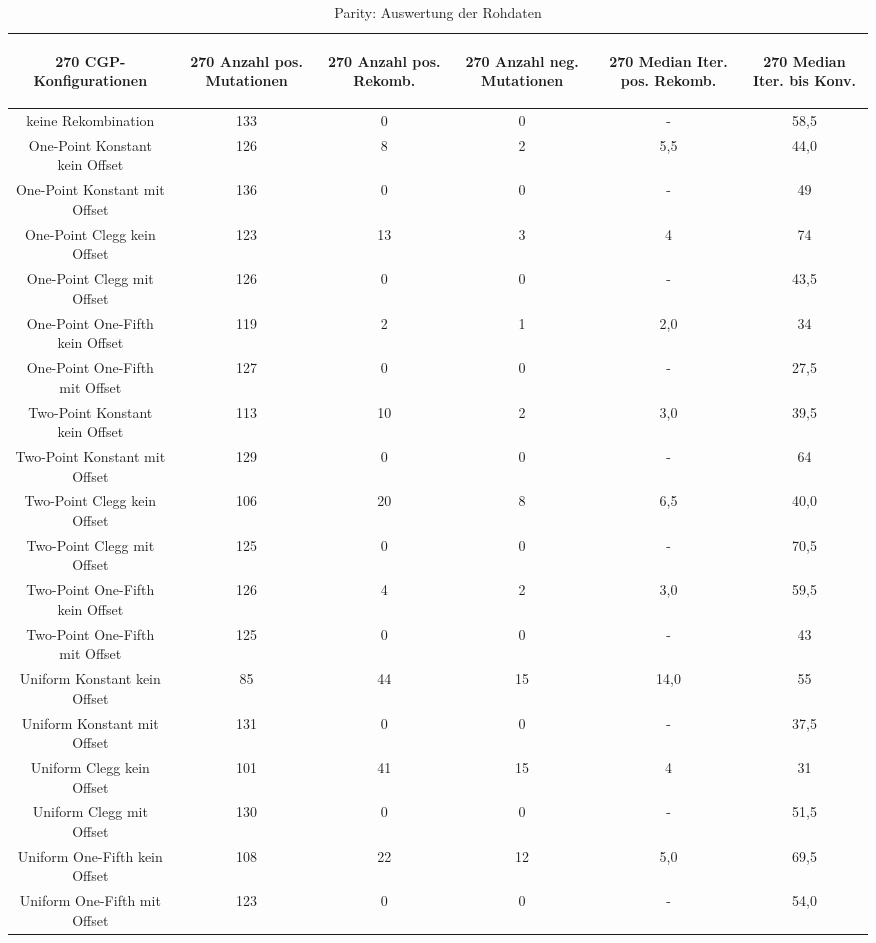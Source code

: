 \begin{table}[H]
	\centering
	\begin{tabular}{c | c | c | c | c | c }
		\begin{turn}{270} \textbf{CGP-Konfigurationen} \end{turn} & \begin{turn}{270} \textbf{Anzahl pos. Mutationen} \end{turn} & \begin{turn}{270} \textbf{Anzahl pos. Rekomb.} \end{turn} & \begin{turn}{270} \textbf{Anzahl neg. Mutationen} \end{turn} & \begin{turn}{270} \textbf{Median Iter. pos. Rekomb.} \end{turn} & \begin{turn}{270} \textbf{Median Iter. bis Konv.} \end{turn}\\
		\hline
		keine Rekombination & 133 & 0 & 0 & - & 58,5\\
		\hline
		One-Point Konstant kein Offset & 126 & 8 & 2 & 5,5 & 44,0\\
		\hline
		One-Point Konstant mit Offset & 136 & 0 & 0 & - & 49\\
		\hline
		One-Point Clegg kein Offset & 123 & 13 & 3 & 4 & 74\\
		\hline
		One-Point Clegg mit Offset & 126 & 0 & 0 & - & 43,5\\
		\hline
		One-Point One-Fifth kein Offset & 119 & 2 & 1 & 2,0 & 34\\
		\hline
		One-Point One-Fifth mit Offset & 127 & 0 & 0 & - & 27,5\\
		\hline
		Two-Point Konstant kein Offset & 113 & 10 & 2 & 3,0 & 39,5\\
		\hline
		Two-Point Konstant mit Offset & 129 & 0 & 0 & - & 64\\
		\hline
		Two-Point Clegg kein Offset & 106 & 20 & 8 & 6,5 & 40,0\\
		\hline
		Two-Point Clegg mit Offset & 125 & 0 & 0 & - & 70,5\\
		\hline
		Two-Point One-Fifth kein Offset & 126 & 4 & 2 & 3,0 & 59,5\\
		\hline
		Two-Point One-Fifth mit Offset & 125 & 0 & 0 & - & 43\\
		\hline
		Uniform Konstant kein Offset & 85 & 44 & 15 & 14,0 & 55\\
		\hline
		Uniform Konstant mit Offset & 131 & 0 & 0 & - & 37,5\\
		\hline
		Uniform Clegg kein Offset & 101 & 41 & 15 & 4 & 31\\
		\hline
		Uniform Clegg mit Offset & 130 & 0 & 0 & - & 51,5\\
		\hline
		Uniform One-Fifth kein Offset & 108 & 22 & 12 & 5,0 & 69,5\\
		\hline
		Uniform One-Fifth mit Offset & 123 & 0 & 0 & - & 54,0\\
	\end{tabular}
	\caption{Parity: Auswertung der Rohdaten}
	\label{table:parityRohdaten}
\end{table}

